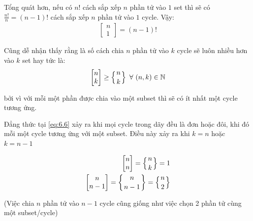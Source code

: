 Tổng quát hơn, nếu có $n!$ cách sắp xếp $n$ phần tử vào $1$ set thì sẽ có $\frac{n!}{n} = (n-1)!$ cách sắp xếp 
$n$ phần tử vào $1$ cycle. Vậy:
\begin{equation}
    \begin{aligned} 
       \begin{bmatrix}
            n \\ 1
       \end{bmatrix} = (n - 1)! 
    \end{aligned} \label{eq:6.5}
\end{equation}

Cũng dễ nhận thấy rằng là số cách chia $n$ phần tử vào $k$ cycle sẽ luôn nhiều hơn vào $k$ set hay tức là:
\begin{equation}
    \begin{aligned}
        \begin{bmatrix}
            n \\ k
        \end{bmatrix} 
        \geq
        \left \{ {n \atop k} \right \} 
        \ \forall \ (n,k) \in \mathbb{N}
    \end{aligned} \label{eq:6.6}
\end{equation}

bởi vì với mỗi một phần được chia vào một subset thì sẽ có ít nhất một cycle tương ứng.

Đẳng thức tại \eqref{eq:6.6} xảy ra khi mọi cycle trong dãy đều là đơn hoặc đôi, 
khi đó mỗi một cycle tương ứng với một subset. Điều này xảy ra khi $k = n$ hoặc $k = n - 1$

\begin{equation}
    \begin{aligned}
        \begin{bmatrix} n \\ n \end{bmatrix} = \left \{ {n \atop k} \right \} = 1 \\  
        \begin{bmatrix} n \\ n - 1 \end{bmatrix} = \left \{ {n \atop n - 1} \right \} 
        = \left \{ {n \atop 2} \right \}
    \end{aligned} \label{eq:6.7}
\end{equation}

(Việc chia $n$ phần tử vào $n-1$ cycle cũng giống như việc chọn 2 phần tử cùng một subset/cycle)

